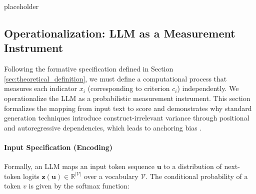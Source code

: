 placeholder


\subsection{Operationalization: LLM as a Measurement Instrument}\label{sec:operationalization}

Following the formative specification defined in Section \ref{sec:theoretical_definition}, we must define a computational process that measures each indicator $x_i$ (corresponding to criterion $c_i$) independently. We operationalize the LLM as a probabilistic measurement instrument. This section formalizes the mapping from input text to score and demonstrates why standard generation techniques introduce construct-irrelevant variance through positional and autoregressive dependencies, which leads to anchoring bias \citep{stureborgLargeLanguageModels2024}.

\paragraph{Input Specification (Encoding)}
Formally, an LLM maps an input token sequence $\mathbf{u}$ to a distribution of next-token logits $\mathbf{z}(\mathbf{u}) \in \mathbb{R}^{|\mathcal{V}|}$ over a vocabulary $\mathcal{V}$. The conditional probability of a token $v$ is given by the softmax function:

